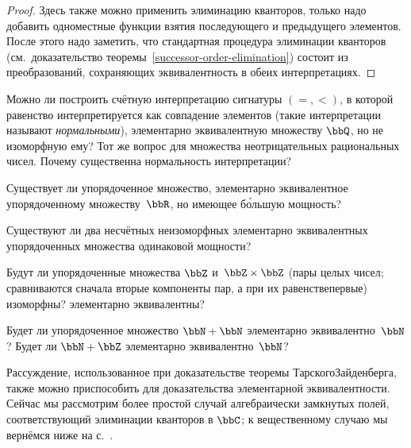 \begin{proof}
Здесь также можно применить элиминацию кванторов,%
только надо
добавить одноместные функции взятия последующего и предыдущего
элементов. После этого надо заметить, что стандартная процедура
элиминации кванторов (см.~доказательство
теоремы~\ref{successor-order-elimination}) состоит из
преобразований, сохраняющих эквивалентность в обеих
интерпретациях.
\end{proof}

\begin{problem}
Можно ли построить счётную интерпретацию сигнатуры $(=,<)$, в
которой равенство интерпретируется как совпадение элементов
(такие интерпретации называют \emph{нормальными}), элементарно
эквивалентную множеству $\bbQ$, но не изоморфную ему? Тот же
вопрос для множества неотрицательных рациональных чисел. Почему
существенна нормальность интерпретации?
\end{problem}

\begin{problem}
Существует ли упорядоченное множество, элементарно эквивалентное
упорядоченному множеству~$\bbR$, но имеющее б\'ольшую мощность?
\end{problem}

\begin{problem}
Существуют ли два несчётных неизоморфных элементарно
эквивалентных упорядоченных множества одинаковой мощности?
\end{problem}

\begin{problem}
        \label{z-times-z-problem}
Будут ли упорядоченные множества $\bbZ$ и~$\bbZ\times\bbZ$
(пары целых чисел; сравниваются сначала вторые компоненты
пар, а при их равенстве\т первые)
изоморфны? элементарно эквивалентны?
\end{problem}

\begin{problem}
Будет ли упорядоченное множество $\bbN+\bbN$ элементарно
эквивалентно~$\bbN$? Будет ли $\bbN+\bbZ$ элементарно
эквивалентно~$\bbN$?
\end{problem}

\medskip

Рассуждение, использованное при доказательстве теоремы
Тарского\ч Зайденберга,%
также можно приспособить для
доказательства элементарной эквивалентности. Сейчас мы
рассмотрим более простой случай алгебраически замкнутых полей,
соответствующий элиминации кванторов в $\bbC$; к вещественному
случаю мы вернёмся ниже на с.~\pageref{real-closed-fields}.

